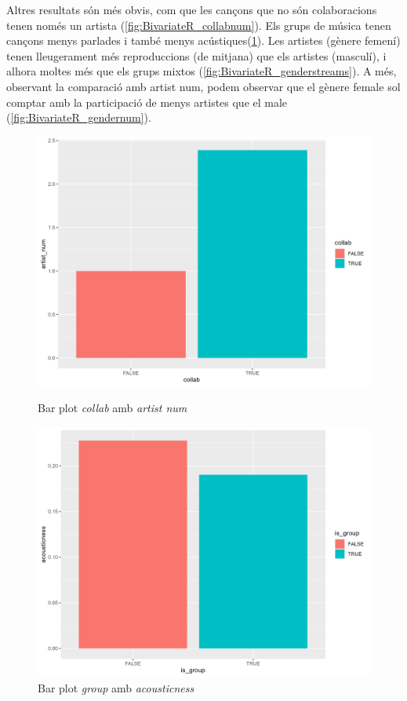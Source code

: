 Altres resultats són més obvis, com que les cançons que no són colaboracions tenen només un artista (\ref{fig:BivariateR_collabnum}). Els grups de música tenen cançons menys parlades i també menys acústiques(\ref{fig:BivariateR_groupacustic}). Les artistes (gènere femení) tenen lleugerament més reproduccions (de mitjana) que els artistes (masculí), i alhora moltes més que els grups mixtos (\ref{fig:BivariateR_genderstreams}). A més, observant la comparació amb artist num, podem observar que el gènere female sol comptar amb la participació de menys artistes que el male (\ref{fig:BivariateR_gendernum}).

\begin{figure}[H]
\centering
    \begin{minipage}{.4\textwidth}
        \centering
        \includegraphics[width=0.95\linewidth]{Images/2_Bivariate/collabnum.png}
        \caption{Bar plot \textit{collab} amb \textit{artist num}}
        \label{fig:BivariateR_collabnum}
    \end{minipage}%
    \begin{minipage}{.4\textwidth}
        \centering
        \includegraphics[width=0.95\linewidth]{Images/2_Bivariate/groupacoustic.png}
        \caption{Bar plot \textit{group} amb \textit{acousticness}}
        \label{fig:BivariateR_groupacustic}
    \end{minipage}%
\end{figure}


